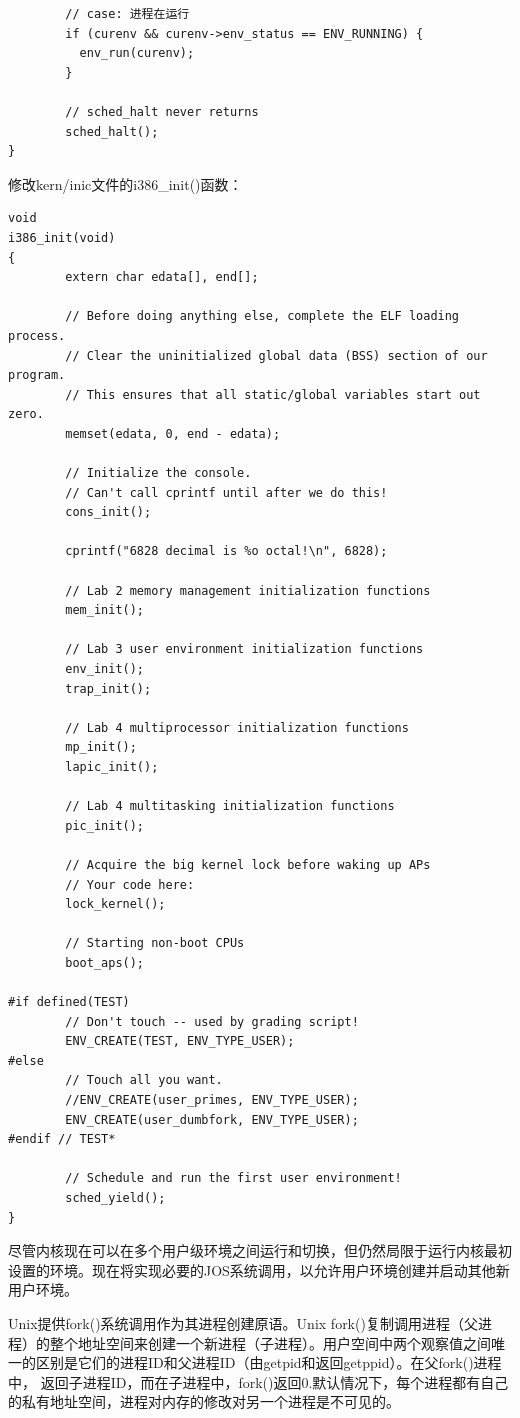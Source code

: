 \begin{ExerciseList}
\begin{verbatim}
        // case: 进程在运行
        if (curenv && curenv->env_status == ENV_RUNNING) {
          env_run(curenv);
        }

        // sched_halt never returns
        sched_halt();
}
\end{verbatim}

修改kern/inic文件的i386\_init()函数：

\begin{verbatim}
void
i386_init(void)
{
        extern char edata[], end[];

        // Before doing anything else, complete the ELF loading process.
        // Clear the uninitialized global data (BSS) section of our program.
        // This ensures that all static/global variables start out zero.
        memset(edata, 0, end - edata);

        // Initialize the console.
        // Can't call cprintf until after we do this!
        cons_init();

        cprintf("6828 decimal is %o octal!\n", 6828);

        // Lab 2 memory management initialization functions
        mem_init();

        // Lab 3 user environment initialization functions
        env_init();
        trap_init();

        // Lab 4 multiprocessor initialization functions
        mp_init();
        lapic_init();

        // Lab 4 multitasking initialization functions
        pic_init();

        // Acquire the big kernel lock before waking up APs
        // Your code here:
        lock_kernel();

        // Starting non-boot CPUs
        boot_aps();

#if defined(TEST)
        // Don't touch -- used by grading script!
        ENV_CREATE(TEST, ENV_TYPE_USER);
#else
        // Touch all you want.
        //ENV_CREATE(user_primes, ENV_TYPE_USER);
        ENV_CREATE(user_dumbfork, ENV_TYPE_USER);
#endif // TEST*

        // Schedule and run the first user environment!
        sched_yield();
}
\end{verbatim}

尽管内核现在可以在多个用户级环境之间运行和切换，但仍然局限于运行内核最初设置的环境。现在将实现必要的JOS系统调用，以允许用户环境创建并启动其他新用户环境。

Unix提供fork()系统调用作为其进程创建原语。Unix fork()复制调用进程（父进程）的整个地址空间来创建一个新进程（子进程）。用户空间中两个观察值之间唯一的区别是它们的进程ID和父进程ID（由getpid和返回getppid）。在父fork()进程中， 返回子进程ID，而在子进程中，fork()返回0.默认情况下，每个进程都有自己的私有地址空间，进程对内存的修改对另一个进程是不可见的。


\end{ExerciseList}
